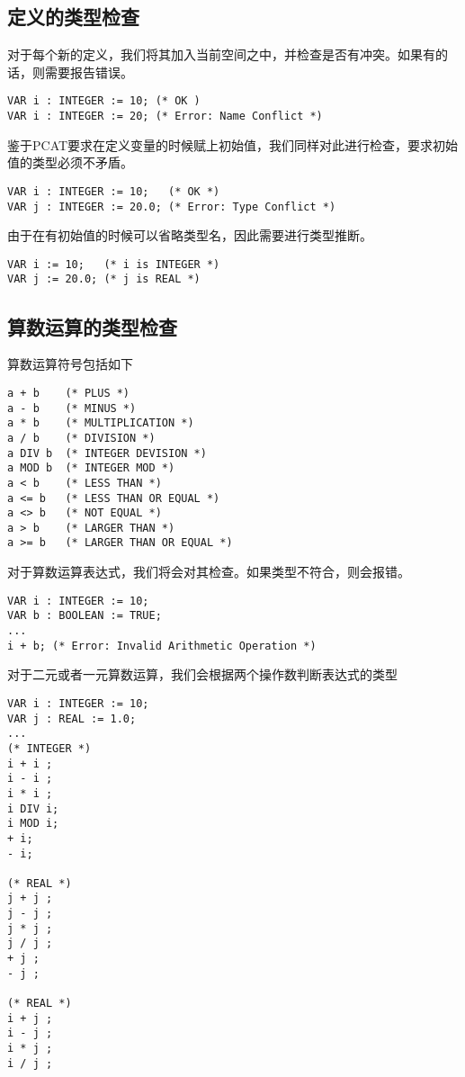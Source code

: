 ﻿\documentclass{article}
\begin{document}
\subsection{定义的类型检查}

对于每个新的定义，我们将其加入当前空间之中，并检查是否有冲突。如果有的话，则需要报告错误。
\begin{lstlisting}
VAR i : INTEGER := 10; (* OK )
VAR i : INTEGER := 20; (* Error: Name Conflict *)
\end{lstlisting}

鉴于PCAT要求在定义变量的时候赋上初始值，我们同样对此进行检查，要求初始值的类型必须不矛盾。
\begin{lstlisting}
VAR i : INTEGER := 10;   (* OK *)
VAR j : INTEGER := 20.0; (* Error: Type Conflict *)
\end{lstlisting}

由于在有初始值的时候可以省略类型名，因此需要进行类型推断。
\begin{lstlisting}
VAR i := 10;   (* i is INTEGER *)
VAR j := 20.0; (* j is REAL *)
\end{lstlisting}

\subsection{算数运算的类型检查}

算数运算符号包括如下
\begin{lstlisting}
a + b    (* PLUS *)
a - b    (* MINUS *)
a * b    (* MULTIPLICATION *)
a / b    (* DIVISION *)
a DIV b  (* INTEGER DEVISION *)
a MOD b  (* INTEGER MOD *)
a < b    (* LESS THAN *)
a <= b   (* LESS THAN OR EQUAL *)
a <> b   (* NOT EQUAL *)
a > b    (* LARGER THAN *)
a >= b   (* LARGER THAN OR EQUAL *)
\end{lstlisting}


对于算数运算表达式，我们将会对其检查。如果类型不符合，则会报错。
\begin{lstlisting}
VAR i : INTEGER := 10;
VAR b : BOOLEAN := TRUE;
...
i + b; (* Error: Invalid Arithmetic Operation *)
\end{lstlisting}

对于二元或者一元算数运算，我们会根据两个操作数判断表达式的类型
\begin{lstlisting}
VAR i : INTEGER := 10;
VAR j : REAL := 1.0;
...
(* INTEGER *)
i + i ; 
i - i ; 
i * i ; 
i DIV i; 
i MOD i;
+ i;
- i;

(* REAL *)
j + j ; 
j - j ; 
j * j ; 
j / j ; 
+ j ; 
- j ; 

(* REAL *)
i + j ; 
i - j ; 
i * j ; 
i / j ; 
\end{lstlisting}
\end{document}
